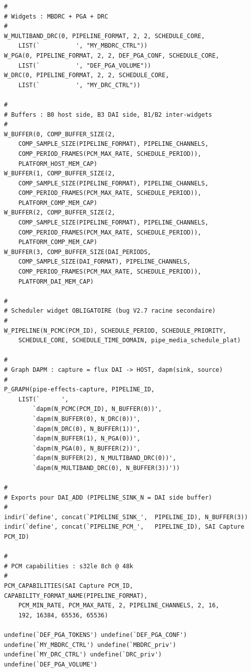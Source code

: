 \documentclass[11pt,a4paper]{article}
\begin{document}
\begin{lstlisting}[language={}, basicstyle=\ttfamily\scriptsize]
#
# Widgets : MBDRC + PGA + DRC
#
W_MULTIBAND_DRC(0, PIPELINE_FORMAT, 2, 2, SCHEDULE_CORE,
    LIST(`          ', "MY_MBDRC_CTRL"))
W_PGA(0, PIPELINE_FORMAT, 2, 2, DEF_PGA_CONF, SCHEDULE_CORE,
    LIST(`          ', "DEF_PGA_VOLUME"))
W_DRC(0, PIPELINE_FORMAT, 2, 2, SCHEDULE_CORE,
    LIST(`          ', "MY_DRC_CTRL"))

#
# Buffers : B0 host side, B3 DAI side, B1/B2 inter-widgets
#
W_BUFFER(0, COMP_BUFFER_SIZE(2,
    COMP_SAMPLE_SIZE(PIPELINE_FORMAT), PIPELINE_CHANNELS,
    COMP_PERIOD_FRAMES(PCM_MAX_RATE, SCHEDULE_PERIOD)),
    PLATFORM_HOST_MEM_CAP)
W_BUFFER(1, COMP_BUFFER_SIZE(2,
    COMP_SAMPLE_SIZE(PIPELINE_FORMAT), PIPELINE_CHANNELS,
    COMP_PERIOD_FRAMES(PCM_MAX_RATE, SCHEDULE_PERIOD)),
    PLATFORM_COMP_MEM_CAP)
W_BUFFER(2, COMP_BUFFER_SIZE(2,
    COMP_SAMPLE_SIZE(PIPELINE_FORMAT), PIPELINE_CHANNELS,
    COMP_PERIOD_FRAMES(PCM_MAX_RATE, SCHEDULE_PERIOD)),
    PLATFORM_COMP_MEM_CAP)
W_BUFFER(3, COMP_BUFFER_SIZE(DAI_PERIODS,
    COMP_SAMPLE_SIZE(DAI_FORMAT), PIPELINE_CHANNELS,
    COMP_PERIOD_FRAMES(PCM_MAX_RATE, SCHEDULE_PERIOD)),
    PLATFORM_DAI_MEM_CAP)

#
# Scheduler widget OBLIGATOIRE (bug V2.7 racine secondaire)
#
W_PIPELINE(N_PCMC(PCM_ID), SCHEDULE_PERIOD, SCHEDULE_PRIORITY,
    SCHEDULE_CORE, SCHEDULE_TIME_DOMAIN, pipe_media_schedule_plat)

#
# Graph DAPM : capture = flux DAI -> HOST, dapm(sink, source)
#
P_GRAPH(pipe-effects-capture, PIPELINE_ID,
    LIST(`      ',
        `dapm(N_PCMC(PCM_ID), N_BUFFER(0))',
        `dapm(N_BUFFER(0), N_DRC(0))',
        `dapm(N_DRC(0), N_BUFFER(1))',
        `dapm(N_BUFFER(1), N_PGA(0))',
        `dapm(N_PGA(0), N_BUFFER(2))',
        `dapm(N_BUFFER(2), N_MULTIBAND_DRC(0))',
        `dapm(N_MULTIBAND_DRC(0), N_BUFFER(3))'))

#
# Exports pour DAI_ADD (PIPELINE_SINK_N = DAI side buffer)
#
indir(`define', concat(`PIPELINE_SINK_',  PIPELINE_ID), N_BUFFER(3))
indir(`define', concat(`PIPELINE_PCM_',   PIPELINE_ID), SAI Capture PCM_ID)

#
# PCM capabilities : s32le 8ch @ 48k
#
PCM_CAPABILITIES(SAI Capture PCM_ID, CAPABILITY_FORMAT_NAME(PIPELINE_FORMAT),
    PCM_MIN_RATE, PCM_MAX_RATE, 2, PIPELINE_CHANNELS, 2, 16,
    192, 16384, 65536, 65536)

undefine(`DEF_PGA_TOKENS') undefine(`DEF_PGA_CONF')
undefine(`MY_MBDRC_CTRL') undefine(`MBDRC_priv')
undefine(`MY_DRC_CTRL') undefine(`DRC_priv')
undefine(`DEF_PGA_VOLUME')
\end{lstlisting}
\end{document}

